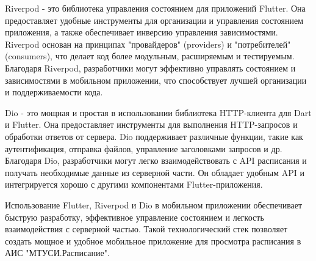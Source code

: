 Riverpod - это библиотека управления состоянием для приложений Flutter.
Она предоставляет удобные инструменты для организации и управления состоянием приложения,
а также обеспечивает инверсию управления зависимостями.
Riverpod основан на принципах "провайдеров" (providers) и "потребителей" (consumers),
что делает код более модульным, расширяемым и тестируемым. Благодаря Riverpod,
разработчики могут эффективно управлять состоянием и зависимостями в мобильном приложении,
что способствует лучшей организации и поддерживаемости кода.

Dio - это мощная и простая в использовании библиотека HTTP-клиента для Dart и Flutter.
Она предоставляет инструменты для выполнения HTTP-запросов и обработки ответов от сервера.
Dio поддерживает различные функции, такие как аутентификация, отправка файлов,
управление заголовками запросов и др. Благодаря Dio, разработчики могут легко взаимодействовать
с API расписания и получать необходимые данные из серверной части.
Он обладает удобным API и интегрируется хорошо с другими компонентами Flutter-приложения.

Использование Flutter, Riverpod и Dio в мобильном приложении обеспечивает быструю разработку,
эффективное управление состоянием и легкость взаимодействия с серверной частью.
Такой технологический стек позволяет создать мощное и удобное мобильное приложение для просмотра расписания в АИС "МТУСИ.Расписание".
